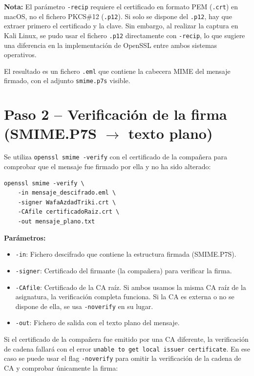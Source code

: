 \textbf{Nota:} El parámetro \texttt{-recip} requiere el certificado en formato PEM (\texttt{.crt}) en macOS, {no} el fichero PKCS\#12 (\texttt{.p12}). Si solo se dispone del \texttt{.p12}, hay que extraer primero el certificado y la clave.
Sin embargo, al realizar la captura en Kali Linux, se pudo usar el fichero \texttt{.p12} directamente con \texttt{-recip}, lo que sugiere una diferencia en la implementación de OpenSSL entre ambos sistemas operativos.

El resultado es un fichero \texttt{.eml} que contiene la cabecera MIME del mensaje firmado, con el adjunto \texttt{smime.p7s} visible.

\section{Paso 2 -- Verificación de la firma (SMIME.P7S $\rightarrow$ texto plano)}

Se utiliza \texttt{openssl smime -verify} con el certificado de la compañera para comprobar que el mensaje fue firmado por ella y no ha sido alterado:

\begin{lstlisting}[caption=Verificación de la firma S/MIME]
openssl smime -verify \
    -in mensaje_descifrado.eml \
    -signer WafaAzdadTriki.crt \
    -CAfile certificadoRaiz.crt \
    -out mensaje_plano.txt
\end{lstlisting}

\textbf{Parámetros:}
\begin{itemize}[label=\textbullet]
    \item \texttt{-in}: Fichero descifrado que contiene la estructura firmada (SMIME.P7S).
    \item \texttt{-signer}: Certificado del firmante (la compañera) para verificar la firma.
    \item \texttt{-CAfile}: Certificado de la CA raíz. Si ambos usamos la misma CA raíz de la asignatura, la verificación completa funciona. Si la CA es externa o no se dispone de ella, se usa \texttt{-noverify} en su lugar.
    \item \texttt{-out}: Fichero de salida con el texto plano del mensaje.
\end{itemize}

Si el certificado de la compañera fue emitido por una CA diferente, la verificación de cadena fallará con el error \texttt{unable to get local issuer certificate}. En ese caso se puede usar el flag \texttt{-noverify} para omitir la verificación de la cadena de CA y comprobar únicamente la firma:

